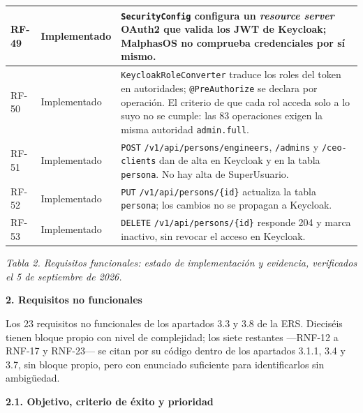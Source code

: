\documentclass[12pt,varwidth=170mm,border=10pt]{standalone}
\newcommand{\sectiontitle}[1]{%
  \par\vspace{1.8ex}%
  {\normalfont\Large\bfseries #1\par}%
  \vspace{1.0ex}%
}
\newcommand{\subsectiontitle}[1]{%
  \par\vspace{1.3ex}%
  {\normalfont\large\bfseries #1\par}%
  \vspace{0.5ex}%
}
\newcommand{\ruta}[1]{\nolinkurl{#1}}
\newcommand{\tablecaption}[2]{%
  \par\vspace{0.4em}%
  \begin{center}
    \footnotesize\textit{Tabla #1. #2}
  \end{center}
  \vspace{1.0em}%
}
\begin{document}
\begin{center}
\begin{tabular}{|p{1.3cm}|p{2.4cm}|p{10.3cm}|}
\hline
RF-49 & Implementado & \texttt{SecurityConfig} configura un \emph{resource server} OAuth2 que valida los JWT de Keycloak; MalphasOS no comprueba credenciales por sí mismo. \\
\hline
RF-50 & Implementado & \texttt{KeycloakRoleConverter} traduce los roles del token en autoridades; \texttt{@PreAuthorize} se declara por operación. El criterio de que cada rol acceda solo a lo suyo no se cumple: las 83 operaciones exigen la misma autoridad \texttt{admin.full}. \\
\hline
RF-51 & Implementado & \texttt{POST} \ruta{/v1/api/persons/engineers}, \ruta{/admins} y \ruta{/ceo-clients} dan de alta en Keycloak y en la tabla \texttt{persona}. No hay alta de SuperUsuario. \\
\hline
RF-52 & Implementado & \texttt{PUT} \ruta{/v1/api/persons/{id}} actualiza la tabla \texttt{persona}; los cambios no se propagan a Keycloak. \\
\hline
RF-53 & Implementado & \texttt{DELETE} \ruta{/v1/api/persons/{id}} responde 204 y marca inactivo, sin revocar el acceso en Keycloak. \\
\hline
\end{tabular}
\end{center}
\tablecaption{2}{Requisitos funcionales: estado de implementación y evidencia, verificados el 5 de septiembre de 2026.}
\endgroup

\sectiontitle{2. Requisitos no funcionales}

Los 23 requisitos no funcionales de los apartados 3.3 y 3.8 de la ERS. Dieciséis tienen bloque propio con nivel de complejidad; los siete restantes —RNF-12 a RNF-17 y RNF-23— se citan por su código dentro de los apartados 3.1.1, 3.4 y 3.7, sin bloque propio, pero con enunciado suficiente para identificarlos sin ambigüedad.

\subsectiontitle{2.1. Objetivo, criterio de éxito y prioridad}
\end{document}
